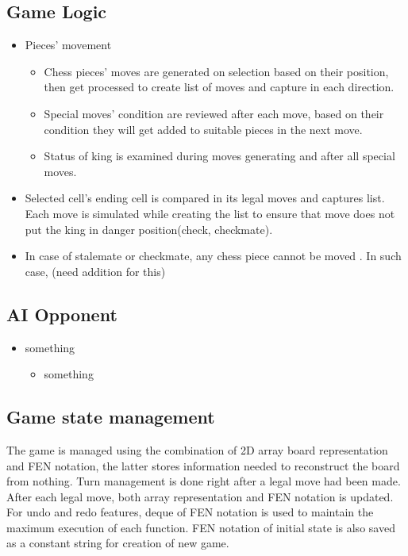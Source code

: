 \documentclass[a4paper, 10pt, titlepage]{article}
\begin{document}
\subsection{Game Logic}
\begin{itemize}
    \item Pieces' movement
          \begin{itemize}
              \item Chess pieces' moves are generated on selection based on their position, then get processed to create list of moves and capture in each direction.
              \item Special moves' condition are reviewed after each move, based on their condition they will get added to suitable pieces in the next move.
              \item Status of king is examined during moves generating and after all special moves.
          \end{itemize}
    \item Selected cell's ending cell is compared in its legal moves and captures list. Each move is simulated while creating the list to ensure that move does not put the king in danger position(check, checkmate).
    \item In case of stalemate or checkmate, any chess piece cannot be moved . In such case, (need addition for this)
\end{itemize}
\subsection{AI Opponent}
\begin{itemize}
    \item something
          \begin{itemize}
              \item something
          \end{itemize}
\end{itemize}
\subsection{Game state management}
The game is managed using the combination of 2D array board representation and FEN notation, the latter stores information needed to reconstruct the board from nothing. Turn management is done right after a legal move had been made. After each legal move, both array representation and FEN notation is updated. For undo and redo features, deque of FEN notation is used to maintain the maximum execution of each function. FEN notation of initial state is also saved as a constant string for creation of new game.
\end{document}
